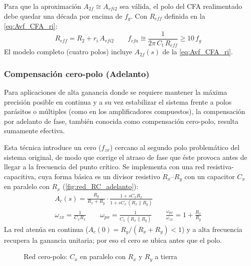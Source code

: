 Para que la aproximación $A_{2f}\cong A_{vfi2}$ sea válida, el polo del CFA realimentado debe quedar una década por encima de $f_g$. Con $R_{eff}$ definida en la \autoref{eq:Avf_CFA_ri}:
\begin{equation}
    R_{eff} = R_2 + r_i\,A_{vfi2} \qquad f_{cfa} \cong \frac{1}{2\pi\,C_t\,R_{eff}} \ge 10\,f_g
\end{equation}
El modelo completo (cuatro polos) incluye $A_{2f}(s)$ de la \autoref{eq:Avf_CFA_ri}.

\subsubsection{Compensación cero-polo (Adelanto)}
\label{sec:adelanto}
Para aplicaciones de alta ganancia donde se requiere mantener la máxima precisión posible en continua y a su vez estabilizar el sistema frente a polos parásitos o múltiples (como en los amplificadores compuestos), la compensación por adelanto de fase, también conocida como compensación cero-polo, resulta sumamente efectiva.

Esta técnica introduce un cero ($f_{zx}$) cercano al segundo polo problemático del sistema original, de modo que corrige el atraso de fase que éste provoca antes de llegar a la frecuencia del punto crítico. Se implementa con una red resistiva-capacitiva, cuya forma básica es un divisor resistivo $R_x$--$R_y$ con un capacitor $C_x$ en paralelo con $R_x$ (\autoref{fig:red_RC_adelanto}):
\begin{equation}
    \begin{gathered}
    A_c(s) = \frac{R_y}{R_x+R_y}\cdot\frac{1+sC_xR_x}{1+sC_x\,(R_x\parallel R_y)} \\
    \omega_{zx} = \frac{1}{C_xR_x} \qquad \omega_{px} = \frac{1}{C_x\,(R_x\parallel R_y)} \qquad \frac{\omega_{px}}{\omega_{zx}} = 1+\frac{R_x}{R_y}
    \end{gathered}
    \label{eq:red_RC}
\end{equation}
La red atenúa en continua ($A_c(0) = R_y/(R_x+R_y)<1$) y a alta frecuencia recupera la ganancia unitaria; por eso el cero se ubica antes que el polo.

\begin{figure}[H]
    \centering
    \caption{Red cero-polo: $C_x$ en paralelo con $R_x$ y $R_y$ a tierra}
    \label{fig:red_RC_adelanto}
\end{figure}

